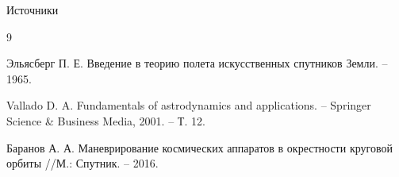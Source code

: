 \documentclass[8pt]{beamer}
\begin{document}
\begin{frame}[allowframebreaks]{Источники}
  \begin{thebibliography}{9}

    Эльясберг П. Е. Введение в теорию полета искусственных спутников Земли. – 1965.

    Vallado D. A. Fundamentals of astrodynamics and applications. – Springer Science \& Business Media, 2001. – Т. 12.

    Баранов А. А. Маневрирование космических аппаратов в окрестности круговой орбиты //М.: Спутник. – 2016.
    
  \end{thebibliography}
\end{frame}
\end{document}

